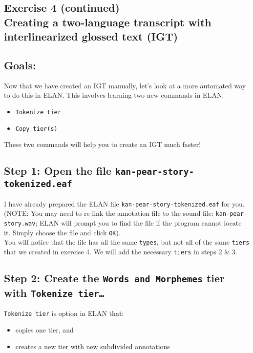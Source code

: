 \documentclass[letterpaper,12pt]{article}
\begin{document}
\begin{center}
\section*{Exercise 4 (continued)\\Creating a two-language transcript with interlinearized glossed text (IGT)}
\end{center}

\subsection*{Goals:}
Now that we have created an IGT manually, let's look at a more automated way to do this in ELAN. This involves learning two new commands in ELAN: 

  \begin{itemize}
    \item \texttt{Tokenize tier}
    \item \texttt{Copy tier(s)}
  \end{itemize}

\noindent These two commands will help you to create an IGT much faster!

\subsection*{Step 1: Open the file \texttt{kan-pear-story-tokenized.eaf}}
I have already prepared the ELAN file \texttt{kan-pear-story-tokenized.eaf} for you. \\

\noindent (NOTE: You may need to re-link the annotation file to the sound file: \texttt{kan-pear-story.wav}; ELAN will prompt you to find the file if the program cannot locate it. Simply choose the file and click \texttt{OK}).\\

\noindent You will notice that the file has all the same \texttt{types}, but not all of the same \texttt{tiers} that we created in exercise 4. We will add the necessary \texttt{tiers} in steps 2 \& 3. 

\subsection*{Step 2: Create the \texttt{Words and Morphemes} tier with \texttt{Tokenize tier\ldots}}
\texttt{Tokenize tier} is option in ELAN that: 
  \begin{itemize}
    \item copies one tier, and 
    \item creates a new tier with new subdivided annotations
  \end{itemize}
\end{document}
